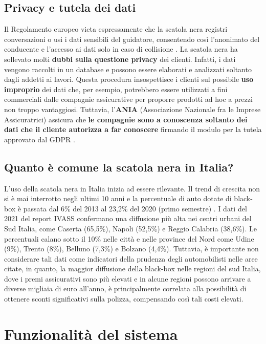\documentclass[12pt, a4paper, italian]{report}
\numberwithin{figure}{chapter}
\numberwithin{table}{chapter}
\begin{document}
\section{Privacy e tutela dei dati}
Il Regolamento europeo vieta espressamente che la scatola nera registri conversazioni o usi i dati sensibili del guidatore, consentendo così l'anonimato del conducente e l'accesso ai dati solo in caso di collisione \cite{RegolamentoEU}.
La scatola nera ha sollevato molti \textbf{dubbi sulla questione privacy} dei clienti. Infatti, i dati vengono raccolti in un database e possono essere elaborati e analizzati soltanto dagli addetti ai lavori. Questa procedura insospettisce i clienti sul possibile \textbf{uso improprio} dei dati che, per esempio, potrebbero essere utilizzati a fini commerciali dalle compagnie assicurative per proporre prodotti ad hoc a prezzi non troppo vantaggiosi. Tuttavia, l’\textbf{ANIA} (Associazione Nazionale fra le Imprese Assicuratrici) assicura che \textbf{le compagnie sono a conoscenza soltanto dei dati che il cliente autorizza a far conoscere} firmando il modulo per la tutela approvato dal GDPR \cite{Generali}.

\section{Quanto è comune la scatola nera in Italia?}
L'uso della scatola nera in Italia inizia ad essere rilevante. Il trend di crescita non si è mai interrotto negli ultimi 10 anni e la percentuale di auto dotate di black-box è passata dal 6\% del 2013 al 23,2\% del 2020 (primo semestre)  \cite{Telepass}. I dati del 2021 del report IVASS confermano una diffusione più alta nei centri urbani del Sud Italia, come Caserta (65,5\%), Napoli (52,5\%) e Reggio Calabria (38,6\%). Le percentuali calano sotto il 10\% nelle città e nelle province del Nord come Udine (9\%), Trento (8\%), Belluno (7,3\%) e Bolzano (4,4\%). Tuttavia, è importante non considerare tali dati come indicatori della prudenza degli automobilisti nelle aree citate, in quanto, la maggior diffusione della black-box nelle regioni del sud Italia, dove i premi assicurativi sono più elevati e in alcune regioni possono arrivare a diverse migliaia di euro all'anno, è principalmente correlata alla possibilità di ottenere sconti significativi sulla polizza, compensando così tali costi elevati.

\chapter{Funzionalità del sistema}
\end{document}
